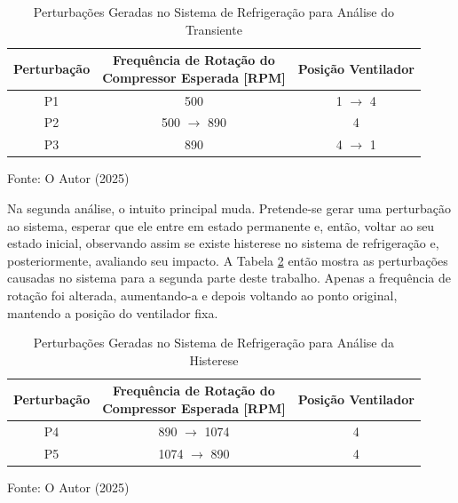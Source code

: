 \begin{table}[htb]
    \centering
    \begin{tabular}{|c|c|c|}
        \hline
        \textbf{Perturbação} & \makecell{\textbf{Frequência de Rotação do} \\ \textbf{Compressor Esperada [RPM]}} & \textbf{Posição Ventilador} \\
        \hline
        P1 & 500 & 1 $\rightarrow$ 4  \\
        P2 & 500 $\rightarrow$ 890 & 4  \\
        P3 & 890 & 4 $\rightarrow$ 1  \\
        \hline
    \end{tabular}
    \caption{Perturbações Geradas no Sistema de Refrigeração para Análise do Transiente}
    \vspace{5pt} 
{\footnotesize Fonte: O Autor (2025) }
    \label{tab:pertubaçõesTransiente}
\end{table}

Na segunda análise, o intuito principal muda. Pretende-se gerar uma perturbação ao sistema, esperar que ele entre em estado permanente e, então, voltar ao seu estado inicial, observando assim se existe histerese no sistema de refrigeração e, posteriormente, avaliando seu impacto. A Tabela \ref{tab:pertubaçõesHisterese} então mostra as perturbações causadas no sistema para a segunda parte deste trabalho. Apenas a frequência de rotação foi alterada, aumentando-a e depois voltando ao ponto original, mantendo a posição do ventilador fixa.
\\
\begin{table}[h]
    \centering
    \begin{tabular}{|c|c|c|}
        \hline
        \textbf{Perturbação} & \makecell{\textbf{Frequência de Rotação do} \\ \textbf{Compressor Esperada [RPM]}} & \textbf{Posição Ventilador} \\
        \hline
        P4 & 890 $\rightarrow$ 1074 & 4  \\
        P5 & 1074 $\rightarrow$ 890 & 4  \\
        \hline
    \end{tabular}
    \caption{Perturbações Geradas no Sistema de Refrigeração para Análise da Histerese}
    
    \vspace{5pt} 
    {\footnotesize Fonte: O Autor (2025)}
    \label{tab:pertubaçõesHisterese}
\end{table}


